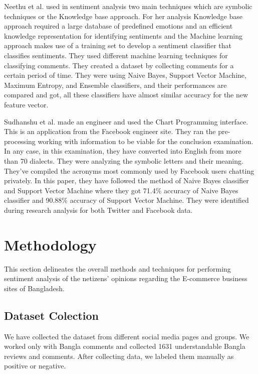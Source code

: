 \documentclass[conference]{IEEEtran}
\begin{document}
\par
Neethu et al.\cite{b7} used in sentiment analysis two main techniques which are symbolic techniques or the Knowledge base approach. For her analysis Knowledge base approach required a large database of predefined emotions and an efficient knowledge representation for identifying sentiments and the Machine learning approach makes use of a training set to develop a sentiment classifier that classifies sentiments. They used different machine learning techniques for classifying comments. They created a dataset by collecting comments for a certain period of time. They were using Naive Bayes, Support Vector Machine, Maximum Entropy, and Ensemble classifiers, and their performances are compared and got, all these classifiers have almost similar accuracy for the new feature vector.\par
Sudhanshu et al.\cite{b8} made an engineer and used the Chart Programming interface. This is an application from the Facebook engineer site. They ran the pre-processing working with information to be viable for the conclusion examination. In any case, in this examination, they have converted into English from more than 70 dialects. They were analyzing the symbolic letters and their meaning. They've compiled the acronyms most commonly used by Facebook users chatting privately. In this paper, they have followed the method of Naive Bayes classifier and Support Vector Machine where they got 71.4\% accuracy of Naive Bayes classifier and 90.88\% accuracy of Support Vector Machine. They were identified during research analysis for both Twitter and Facebook data.\par


\vspace{0.5cm}
\section{Methodology}
This section delineates the overall methods and techniques for performing sentiment analysis of the netizens' opinions regarding the E-commerce business sites of Bangladesh.

\subsection{Dataset Colection}
We have collected the dataset from different social media pages and groups. We worked only with Bangla comments and collected 1631 understandable Bangla reviews and comments. After collecting data, we labeled them manually as positive or negative.
\end{document}
